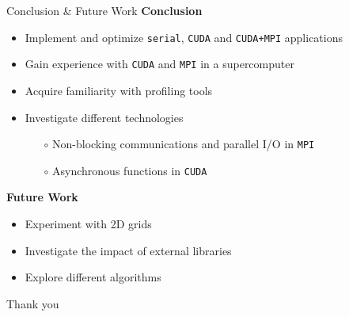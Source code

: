 \documentclass[10pt]{beamer}
\begin{document}
\begin{frame}{Conclusion \& Future Work}
\textbf{Conclusion}
\begin{itemize}
	\vspace{-0.2cm}
	\item Implement and optimize \texttt{serial}, \texttt{CUDA} and \texttt{CUDA+MPI} applications
	\item Gain experience with \texttt{CUDA} and \texttt{MPI} in a supercomputer
	\item Acquire familiarity with profiling tools
	\item Investigate different technologies
	\begin{itemize}
		\item[$\circ$] Non-blocking communications and parallel I/O in \texttt{MPI}
		\item[$\circ$] Asynchronous functions in \texttt{CUDA}
	\end{itemize}
\end{itemize}

\textbf{Future Work}
\begin{itemize}
	\vspace{-0.2cm}
	\item Experiment with 2D grids
	\item Investigate the impact of external libraries
	\item Explore different algorithms
\end{itemize}
\pause
\selectfont %
\hfill
\huge
\alert{Thank you}

\end{frame}
\end{document}
